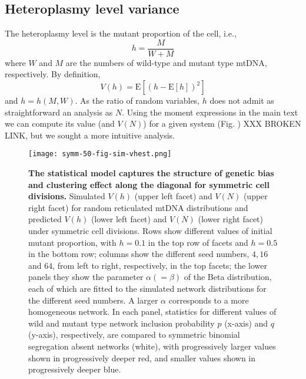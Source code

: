 \documentclass{article}
\begin{document}
\begin{appendices}
\section{Heteroplasmy level variance}\label{app:taylor}
The heteroplasmy level is the mutant proportion of the cell, i.e.,
\begin{equation*}
    h=\frac{M}{W+M}
\end{equation*}
where $W$ and $M$ are the numbers of wild-type and mutant type mtDNA, respectively. By definition,
\begin{equation*}
    V(h)=\mathrm{E}\left[(h-\mathrm{E}[h])^2\right]
\end{equation*}
and $h=h(M,W)$. As the ratio of random variables, $h$ does not admit as straightforward an analysis as $N$. Using the moment expressions in the main text we can compute its value (and $V(N)$) for a given system (Fig. \label{fig:vhestimate-symm}) XXX BROKEN LINK, but we sought a more intuitive analysis.


\begin{figure}
\centering
\texttt{[image: symm-50-fig-sim-vhest.png]}
\caption{\textbf{The statistical model captures the structure of genetic bias and clustering effect along the diagonal for symmetric cell divisions.} Simulated $V(h)$ (upper left facet) and $V(N)$ (upper right facet) for random reticulated mtDNA distributions and predicted $V(h)$ (lower left facet) and $V(N)$ (lower right facet) under symmetric cell divisions. Rows show different values of initial mutant proportion, with $h=0.1$ in the top row of facets and $h=0.5$ in the bottom row; columns show the different seed numbers, $4, 16$ and $64$, from left to right, respectively, in the top facets; the lower panels they show the parameter $\alpha(=\beta)$ of the Beta distribution, each of which are fitted to the simulated network distributions for the different seed numbers. A larger $\alpha$ corresponds to a more homogeneous network. In each panel, statistics for different values of wild and mutant type network inclusion probability $p$ (x-axis) and $q$ (y-axis), respectively, are compared to symmetric binomial segregation absent networks (white), with progressively larger values shown in progressively deeper red, and smaller values shown in progressively deeper blue.}\label{fig:vhestimate-symm}
\end{figure}


\end{appendices}
\end{document}
